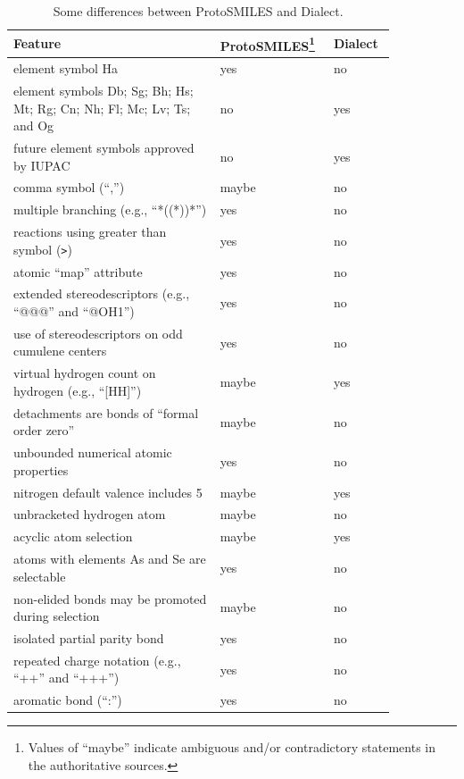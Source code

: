\documentclass{article}
\def\ttt{\texttt}
\begin{document}
\begin{table}
\begin{minipage}{\textwidth}
\renewcommand*\footnoterule{}
    \caption{Some differences between ProtoSMILES and Dialect.}
    \centering
    \begin{tabular}{p{0.50\linewidth} p{0.20\linewidth} p{0.15\linewidth}}
        \hline
        Feature & ProtoSMILES\footnote{Values of \enquote{maybe} indicate ambiguous and/or contradictory statements in the authoritative sources.} & Dialect \\
        \hline
        element symbol Ha & yes & no \\
        element symbols Db; Sg; Bh; Hs; Mt; Rg; Cn; Nh; Fl; Mc; Lv; Ts; and Og & no & yes \\
        future element symbols approved by IUPAC & no & yes \\
        comma symbol (\enquote{,}) & maybe & no \\
        multiple branching (e.g., \enquote{*((*))*}) & yes & no \\
        reactions using greater than symbol (\ttt{>}) & yes & no \\
        atomic \enquote{map} attribute & yes & no \\
        extended stereodescriptors (e.g., \enquote{@@@} and \enquote{@OH1}) & yes & no \\
        use of stereodescriptors on odd cumulene centers & yes & no \\
        virtual hydrogen count on hydrogen (e.g., \enquote{[HH]}) & maybe & yes \\
        detachments are bonds of \enquote{formal order zero} & maybe & no \\
        unbounded numerical atomic properties & yes & no \\
        nitrogen default valence includes 5 & maybe & yes \\
        unbracketed hydrogen atom & maybe & no \\
        acyclic atom selection & maybe & yes \\
        atoms with elements As and Se are selectable & yes & no \\
        non-elided bonds may be promoted during selection & maybe & no \\
        isolated partial parity bond & yes & no \\
        repeated charge notation (e.g., \enquote{++} and \enquote{+++}) & yes & no \\
        aromatic bond (\enquote{:}) & yes & no \\
        \hline
    \end{tabular}
    \label{table:feature-comparison}
\end{minipage}
\end{table}
\end{document}

